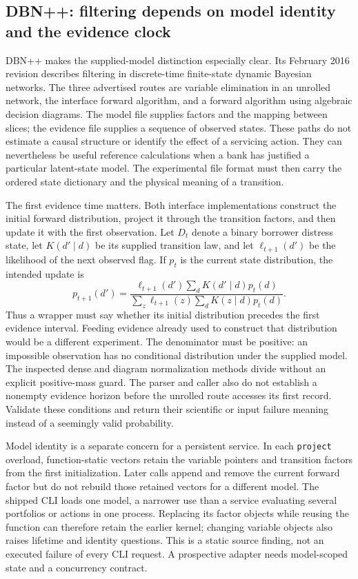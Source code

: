\subsection{DBN++: filtering depends on model identity and the evidence clock}
\label{rel19:dbnpp}

DBN++ makes the supplied-model distinction especially clear. Its February
2016 revision describes filtering in discrete-time finite-state dynamic
Bayesian networks. The three advertised routes are variable elimination in
an unrolled network, the interface forward algorithm, and a forward algorithm
using algebraic decision diagrams. The model file supplies factors and the
mapping between slices; the evidence file supplies a sequence of observed
states. These paths do not estimate a causal structure or identify the effect
of a servicing action. They can nevertheless be useful reference calculations
when a bank has justified a particular latent-state model. The experimental
file format must then carry the ordered state dictionary and the physical
meaning of a transition. \citep{rel19dbnpp}

The first evidence time matters. Both interface implementations construct the
initial forward distribution, project it through the transition factors, and
then update it with the first observation. Let $D_t$ denote a binary borrower
distress state, let $K(d'\mid d)$ be its supplied transition law, and let
$\ell_{t+1}(d')$ be the likelihood of the next observed flag. If $p_t$ is the
current state distribution, the intended update is
\begin{equation}
 p_{t+1}(d')=
 \frac{\ell_{t+1}(d')\sum_d K(d'\mid d)p_t(d)}
 {\sum_z\ell_{t+1}(z)\sum_d K(z\mid d)p_t(d)}.
 \label{rel19:filter}
\end{equation}
Thus a wrapper must say whether its initial distribution precedes the first
evidence interval. Feeding evidence already used to construct that distribution
would be a different experiment. The denominator must be positive: an
impossible observation has no conditional distribution under the supplied
model. The inspected dense and diagram normalization methods divide without
an explicit positive-mass guard. The parser and caller also do not establish
a nonempty evidence horizon before the unrolled route accesses its first
record. Validate these conditions and return their scientific or input failure
meaning instead of a seemingly valid probability. \citep{rel19dbnpp}

Model identity is a separate concern for a persistent service. In each
\texttt{project} overload, function-static vectors retain the variable pointers
and transition factors from the first initialization. Later calls append and
remove the current forward factor but do not rebuild those retained vectors
for a different model. The shipped CLI loads one model, a narrower use than
a service evaluating several portfolios or actions in one process. Replacing
its factor objects while reusing the function can therefore retain the earlier
kernel; changing variable objects also raises lifetime and identity questions.
This is a static source finding, not an executed failure of every CLI request.
A prospective adapter needs model-scoped state and a concurrency contract.
\citep{rel19dbnpp}

